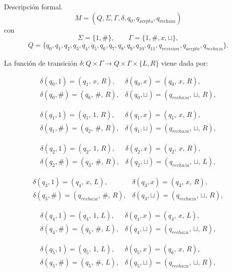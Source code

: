 \documentclass{article}
\begin{document}
\begin{enumerate}
Descripción formal.
\[
M=(Q,\Sigma,\Gamma,\delta,q_0,q_{\text{acepta}},q_{\text{rechaza}})
\]
con
\[
\Sigma=\{1,\#\},\qquad \Gamma=\{1,\# ,x,\sqcup\},
\]
\[
Q=\{q_0,q_1,q_2,q_3,q_4,q_5,q_6,q_7,q_8,q_9,q_{10},q_{11},q_{revision},q_{acepta},q_{rechaza}\}.
\]


La función de transición \(\delta:Q\times\Gamma\to Q\times\Gamma\times\{L,R\}\) viene dada por:

\[
\begin{array}{ll}
\delta(q_0,1)       = (q_1,\,x,\,R), &
\delta(q_0,x)       = (q_0,\,x,\,R),\\[4pt]
\delta(q_0,\#)      = (q_6,\,\#,\,R), &
\delta(q_0,\sqcup)  = (q_{rechaza},\,\sqcup,\,R),
\end{array}
\]

\[
\begin{array}{ll}
\delta(q_1,1)       = (q_1,\,1,\,R), &
\delta(q_1,x)       = (q_1,\,x,\,R),\\[4pt]
\delta(q_1,\#)      = (q_2,\,\#,\,R), &
\delta(q_1,\sqcup)  = (q_{rechaza},\,\sqcup,\,R),
\end{array}
\]

\[
\begin{array}{ll}
\delta(q_2,1)       = (q_2,\,1,\,R), &
\delta(q_2,x)       = (q_2,\,x,\,R),\\[4pt]
\delta(q_2,\#)      = (q_3,\,\#,\,R), &
\delta(q_2,\sqcup)  = (q_{rechaza},\,\sqcup,\,L),
\end{array}
\]

\[
\begin{array}{ll}
\delta(q_3,1)       = (q_4,\,x,\,L), &
\delta(q_3,x)       = (q_3,\,x,\,R),\\[4pt]
\delta(q_3,\#)      = (q_{rechaza},\,\#,\,R), &
\delta(q_3,\sqcup)  = (q_{rechaza},\,\sqcup,\,R),
\end{array}
\]

\[
\begin{array}{ll}
\delta(q_4,1)       = (q_4,\,1,\,L), &
\delta(q_4,x)       = (q_4,\,x,\,L),\\[4pt]
\delta(q_4,\#)      = (q_5,\,\#,\,L), &
\delta(q_4,\sqcup)  = (q_{rechaza},\,\sqcup,\,R),
\end{array}
\]

\[
\begin{array}{ll}
\delta(q_5,1)       = (q_5,\,1,\,L), &
\delta(q_5,x)       = (q_6,\,x,\,R),\\[4pt]
\delta(q_5,\#)      = (q_5,\,\#,\,L), &
\delta(q_5,\sqcup)  = (q_{rechaza},\,\sqcup,\,R),
\end{array}
\]


\end{enumerate}
\end{document}
